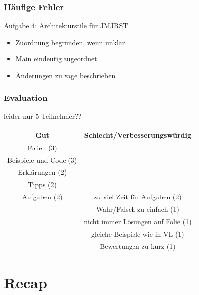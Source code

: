\documentclass[18pt]{beamer}
\begin{document}
	\begin{frame}
		\frametitle{Häufige Fehler}
		\begin{block}{Aufgabe 4: Architekturstile für JMJRST}
			\begin{itemize}
				\item Zuordnung begründen, wenn unklar \pause
				\item Main eindeutig zugeordnet \pause
				\item Änderungen zu vage beschrieben
			\end{itemize}
		\end{block}
	\end{frame}

	\begin{frame}
	\frametitle{Evaluation}
	leider nur 5 Teilnehmer??
	\centering
	\begin{table}
		\begin{tabular}{|c|c|}
			\hline 
			Gut & Schlecht/Verbesserungswürdig \\ 
			\hline
			Folien (3) & \\
			Beispiele und Code (3) & \\ 
			Erklärungen (2) & \\
			Tipps (2) & \\
			Aufgaben (2)&  zu viel Zeit für Aufgaben (2)\\ 
			&  Wahr/Falsch zu einfach (1)\\ 
			& nicht immer Lösungen auf Folie (1)\\
			& gleiche Beispiele wie in VL (1) \\
			& Bewertungen zu kurz (1)\\
			\hline 
		\end{tabular} 
	\end{table}

	\end{frame}

\section{Recap}
\end{document}
